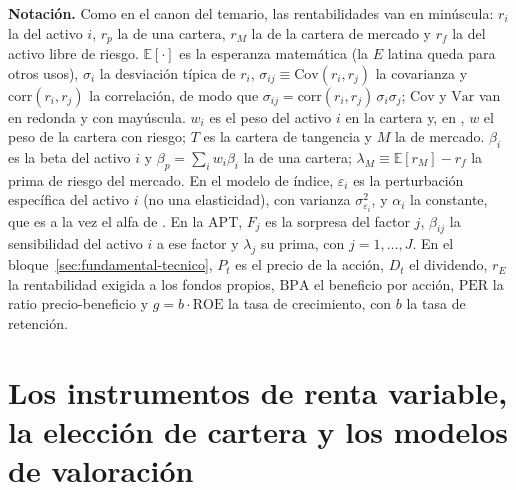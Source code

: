 \documentclass[11pt]{article}
\begin{document}
\begin{anotaciones}
\textbf{Notación.} Como en el canon del temario, las rentabilidades van en minúscula: $r_i$ la del activo $i$, $r_p$ la de una cartera, $r_M$ la de la cartera de mercado y $r_f$ la del activo libre de riesgo. $\mathbb{E}[\cdot]$ es la esperanza matemática (la $E$ latina queda para otros usos), $\sigma_i$ la desviación típica de $r_i$, $\sigma_{ij}\equiv\mathrm{Cov}(r_i,r_j)$ la covarianza y $\mathrm{corr}(r_i,r_j)$ la correlación, de modo que $\sigma_{ij}=\mathrm{corr}(r_i,r_j)\,\sigma_i\sigma_j$; $\mathrm{Cov}$ y $\mathrm{Var}$ van en redonda y con mayúscula. $w_i$ es el peso del activo $i$ en la cartera y, en , $w$ el peso de la cartera con riesgo; $T$ es la cartera de tangencia y $M$ la de mercado. $\beta_i$ es la beta del activo $i$ y $\beta_p=\sum_iw_i\beta_i$ la de una cartera; $\lambda_M\equiv\mathbb{E}[r_M]-r_f$ la prima de riesgo del mercado. En el modelo de índice, $\varepsilon_i$ es la perturbación específica del activo $i$ (no una elasticidad), con varianza $\sigma_{\varepsilon_i}^2$, y $\alpha_i$ la constante, que es a la vez el alfa de . En la APT, $F_j$ es la sorpresa del factor $j$, $\beta_{ij}$ la sensibilidad del activo $i$ a ese factor y $\lambda_j$ su prima, con $j=1,\dots,J$. En el bloque~\ref{sec:fundamental-tecnico}, $P_t$ es el precio de la acción, $D_t$ el dividendo, $r_E$ la rentabilidad exigida a los fondos propios, $\mathrm{BPA}$ el beneficio por acción, $\mathrm{PER}$ la ratio precio-beneficio y $g=b\cdot\mathrm{ROE}$ la tasa de crecimiento, con $b$ la tasa de retención.
\end{anotaciones}

\section{Los instrumentos de renta variable,\cortetitulo{} la elección de cartera y los modelos de valoración}\label{sec:cartera-valoracion}
\end{document}
